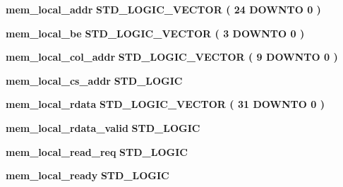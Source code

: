 \begin{DoxyCompactItemize}
\item 
{\bf mem\+\_\+local\+\_\+addr} {\bfseries \textcolor{comment}{S\+T\+D\+\_\+\+L\+O\+G\+I\+C\+\_\+\+V\+E\+C\+T\+OR}\textcolor{vhdlchar}{ }\textcolor{vhdlchar}{(}\textcolor{vhdlchar}{ }\textcolor{vhdlchar}{ } \textcolor{vhdldigit}{24} \textcolor{vhdlchar}{ }\textcolor{keywordflow}{D\+O\+W\+N\+TO}\textcolor{vhdlchar}{ }\textcolor{vhdlchar}{ } \textcolor{vhdldigit}{0} \textcolor{vhdlchar}{ }\textcolor{vhdlchar}{)}\textcolor{vhdlchar}{ }} 
\item 
{\bf mem\+\_\+local\+\_\+be} {\bfseries \textcolor{comment}{S\+T\+D\+\_\+\+L\+O\+G\+I\+C\+\_\+\+V\+E\+C\+T\+OR}\textcolor{vhdlchar}{ }\textcolor{vhdlchar}{(}\textcolor{vhdlchar}{ }\textcolor{vhdlchar}{ } \textcolor{vhdldigit}{3} \textcolor{vhdlchar}{ }\textcolor{keywordflow}{D\+O\+W\+N\+TO}\textcolor{vhdlchar}{ }\textcolor{vhdlchar}{ } \textcolor{vhdldigit}{0} \textcolor{vhdlchar}{ }\textcolor{vhdlchar}{)}\textcolor{vhdlchar}{ }} 
\item 
{\bf mem\+\_\+local\+\_\+col\+\_\+addr} {\bfseries \textcolor{comment}{S\+T\+D\+\_\+\+L\+O\+G\+I\+C\+\_\+\+V\+E\+C\+T\+OR}\textcolor{vhdlchar}{ }\textcolor{vhdlchar}{(}\textcolor{vhdlchar}{ }\textcolor{vhdlchar}{ } \textcolor{vhdldigit}{9} \textcolor{vhdlchar}{ }\textcolor{keywordflow}{D\+O\+W\+N\+TO}\textcolor{vhdlchar}{ }\textcolor{vhdlchar}{ } \textcolor{vhdldigit}{0} \textcolor{vhdlchar}{ }\textcolor{vhdlchar}{)}\textcolor{vhdlchar}{ }} 
\item 
{\bf mem\+\_\+local\+\_\+cs\+\_\+addr} {\bfseries \textcolor{comment}{S\+T\+D\+\_\+\+L\+O\+G\+IC}\textcolor{vhdlchar}{ }} 
\item 
{\bf mem\+\_\+local\+\_\+rdata} {\bfseries \textcolor{comment}{S\+T\+D\+\_\+\+L\+O\+G\+I\+C\+\_\+\+V\+E\+C\+T\+OR}\textcolor{vhdlchar}{ }\textcolor{vhdlchar}{(}\textcolor{vhdlchar}{ }\textcolor{vhdlchar}{ } \textcolor{vhdldigit}{31} \textcolor{vhdlchar}{ }\textcolor{keywordflow}{D\+O\+W\+N\+TO}\textcolor{vhdlchar}{ }\textcolor{vhdlchar}{ } \textcolor{vhdldigit}{0} \textcolor{vhdlchar}{ }\textcolor{vhdlchar}{)}\textcolor{vhdlchar}{ }} 
\item 
{\bf mem\+\_\+local\+\_\+rdata\+\_\+valid} {\bfseries \textcolor{comment}{S\+T\+D\+\_\+\+L\+O\+G\+IC}\textcolor{vhdlchar}{ }} 
\item 
{\bf mem\+\_\+local\+\_\+read\+\_\+req} {\bfseries \textcolor{comment}{S\+T\+D\+\_\+\+L\+O\+G\+IC}\textcolor{vhdlchar}{ }} 
\item 
{\bf mem\+\_\+local\+\_\+ready} {\bfseries \textcolor{comment}{S\+T\+D\+\_\+\+L\+O\+G\+IC}\textcolor{vhdlchar}{ }} 

\end{DoxyCompactItemize}
